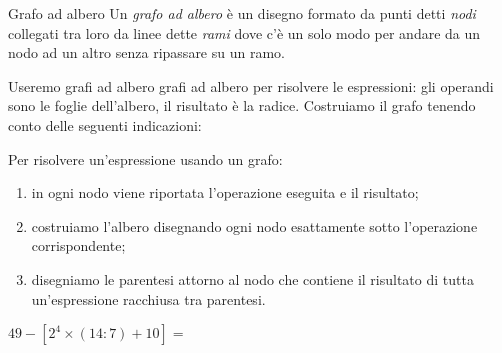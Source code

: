 \begin{definizione}{Grafo ad albero}{}
Un \emph{grafo ad albero} è un disegno formato da punti detti \emph{nodi} 
collegati tra loro da linee dette \emph{rami} dove c'è un solo modo per 
andare da un nodo ad un altro senza ripassare su un ramo.
\end{definizione}


Useremo grafi ad albero grafi ad albero per risolvere le espressioni:
gli operandi sono le foglie dell'albero, il risultato è la radice. 
Costruiamo il grafo tenendo conto delle seguenti indicazioni:

\begin{procedura}{}{}
 Per risolvere un'espressione usando un grafo:
\begin{enumerate} [noitemsep]
 \item in ogni nodo viene riportata l'operazione eseguita e il risultato;
 \item costruiamo l'albero disegnando ogni nodo esattamente sotto
  l'operazione corrispondente;
 \item disegniamo le parentesi attorno al nodo che contiene il
  risultato di tutta un'espressione racchiusa tra parentesi.
\end{enumerate}
\end{procedura}


 \begin{esempio}{}{}
  \(49 - [2^4 \times (14 : 7) + 10]=\)

\end{esempio}

